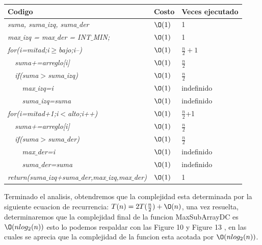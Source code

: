 \documentclass[spanish]{article}
\begin{document}
	\begin{center}
		\begin{table}[H]
			\begin{tabular}{|l|l|l|}
				\hline
				\rowcolor[HTML]{FFCC67} 
				Codigo                           & Costo & Veces ejecutado \\ \hline
				\textit{suma, suma$\_$izq, suma$\_$der}                    & $\O(1)$    & 1               \\ \hline
				\textit{max$\_$izq = max$\_$der = INT$\_$MIN;}                    & $\O(1)$    & 1               \\ \hline								
				\textit{for(i=mitad;i$\geq$bajo;i--)} & $\O(1)$    & $\frac{n}{2}+1$             \\ \hline
				\textit{\  \  suma+=arreglo[i]}                 & $\O(1)$    & $\frac{n}{2}$               \\ \hline
				\textit{\  \  if(suma$>$suma$\_$izq)}                 & $\O(1)$    & $\frac{n}{2}$               \\ \hline
				\textit{\  \  \  \  max$\_$izq=i}                     & $\O(1)$    & indefinido              \\ \hline
				\textit{\  \  \  \  suma$\_$izq=suma}                     & $\O(1)$    & indefinido              \\ \hline				
				\textit{for(i=mitad+1;i$<$alto;i++)} & $\O(1)$    & $\frac{n}{2}$+1             \\ \hline
				\textit{\  \  suma+=arreglo[i]}                 & $\O(1)$    & $\frac{n}{2}$               \\ \hline
				\textit{\  \  if(suma$>$suma$\_$der)}                 & $\O(1)$    & $\frac{n}{2}$               \\ \hline
				\textit{\  \  \  \  max$\_$der=i}                     & $\O(1)$    & indefinido              \\ \hline
				\textit{\  \  \  \  suma$\_$der=suma}                     & $\O(1)$    & indefinido              \\ \hline			
				\textit{return(suma$\_$izq+suma$\_$der,max$\_$izq,max$\_$der)}                     & $\O(1)$    & 1              \\ \hline			
			\end{tabular}
		\end{table}										
	\end{center}
	Terminado el analisis, obtendremos que la complejidad esta determinada por la siguiente ecuacion de recurrencia: $T(n) = 2T(\frac{n}{2})+\O(n)$, una vez resuelta, determinaremos que la complejidad final de la funcion MaxSubArrayDC es $\O(nlog_2(n))$ esto lo podemos respaldar con las Figure 10 y Figure 13 , en las cuales se aprecia que la complejidad de la funcion esta acotada por $\O(nlog_2(n))$.
\end{document}
